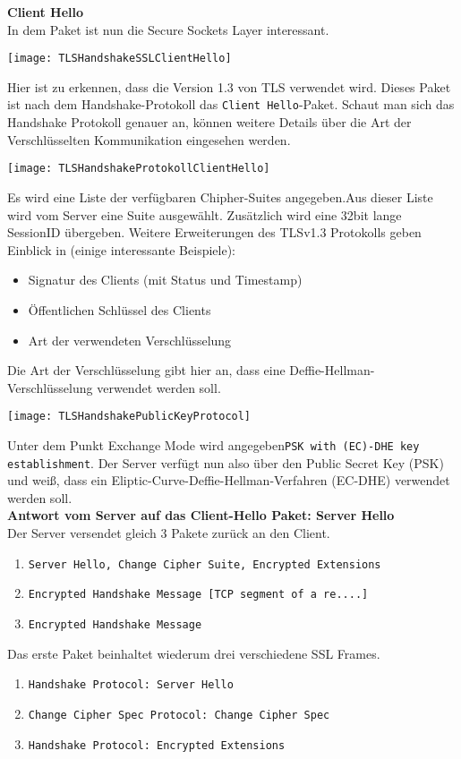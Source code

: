 \textbf{Client Hello}\\
In dem Paket ist nun die Secure Sockets Layer interessant.
\begin{center}
    \texttt{[image: TLSHandshakeSSLClientHello]}
\end{center}
Hier ist zu erkennen, dass die Version 1.3 von TLS verwendet wird. Dieses Paket ist nach
dem Handshake-Protokoll das \texttt{Client Hello}-Paket.
Schaut man sich das Handshake Protokoll genauer an, können weitere Details über
die Art der Verschlüsselten Kommunikation eingesehen werden.
\begin{center}
    \texttt{[image: TLSHandshakeProtokollClientHello]}
\end{center}
Es wird eine Liste der verfügbaren Chipher-Suites angegeben.Aus dieser Liste wird vom Server eine
Suite ausgewählt. Zusätzlich wird eine 32bit lange SessionID übergeben. 
Weitere Erweiterungen des TLSv1.3 Protokolls geben Einblick in (einige interessante Beispiele):
\begin{itemize}
    \item Signatur des Clients (mit Status und Timestamp)
    \item Öffentlichen Schlüssel des Clients
    \item Art der verwendeten Verschlüsselung
\end{itemize}
Die Art der Verschlüsselung gibt hier an, dass eine Deffie-Hellman-Verschlüsselung verwendet
werden soll.
\begin{center}
    \texttt{[image: TLSHandshakePublicKeyProtocol]}
\end{center}
Unter dem Punkt Exchange Mode wird angegeben\texttt{PSK with (EC)-DHE key establishment}.
Der Server verfügt nun also über den Public Secret Key (PSK) und weiß, dass ein 
Eliptic-Curve-Deffie-Hellman-Verfahren (EC-DHE) 
verwendet werden soll. \\

\textbf{Antwort vom Server auf das Client-Hello Paket: Server Hello}\\
Der Server versendet gleich 3 Pakete zurück an den Client. 
\begin{enumerate}
    \item \texttt{Server Hello, Change Cipher Suite, Encrypted Extensions}
    \item \texttt{Encrypted Handshake Message [TCP segment of a re....]}
    \item \texttt{Encrypted Handshake Message}
\end{enumerate}
Das erste Paket beinhaltet wiederum drei verschiedene SSL Frames.
\begin{enumerate}
    \item \texttt{Handshake Protocol: Server Hello}
    \item \texttt{Change Cipher Spec Protocol: Change Cipher Spec}
    \item \texttt{Handshake Protocol: Encrypted Extensions}
\end{enumerate}

